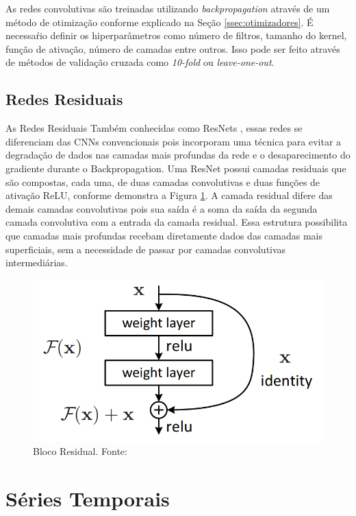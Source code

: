 As redes convolutivas são treinadas utilizando \textit{backpropagation} através de um método de otimização conforme explicado na Seção \ref{ssec:otimizadores}. É necessaŕio definir os hiperparâmetros como número de filtros, tamanho do kernel, função de ativação, número de camadas entre outros. Isso pode ser feito através de métodos de validação cruzada como \textit{10-fold} ou \textit{leave-one-out}.

\subsection{Redes Residuais}
As Redes Residuais Também conhecidas como ResNets \cite{resnet2015}, essas redes se diferenciam das CNNs convencionais pois incorporam uma técnica para evitar a degradação de dados nas camadas mais profundas da rede e o desaparecimento do gradiente durante o Backpropagation. Uma ResNet possui camadas residuais que são compostas, cada uma, de duas camadas convolutivas e duas funções de ativação ReLU, conforme demonstra a Figura \ref{fig-resblock}. A camada residual difere das  demais camadas convolutivas pois sua saída é a soma da saída da segunda camada convolutiva com a entrada da camada residual. Essa estrutura possibilita que camadas mais profundas recebam diretamente dados das camadas mais superficiais, sem a necessidade de passar por camadas convolutivas intermediárias.

\begin{figure}[H]
	\centering
	\includegraphics[scale=0.3]{pasta1_figuras/resblock.png}
	\caption {Bloco Residual. Fonte: \cite{resnet2015}}
	\label{fig-resblock}
\end{figure}

\section{Séries Temporais}

